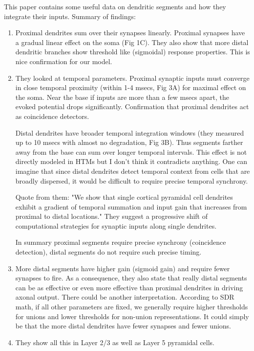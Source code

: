 \documentclass{article} %
\begin{document}
This paper \cite{Branco2011} contains some useful data on dendritic segments
and how they integrate their inputs. Summary of findings:

\begin{enumerate}

\item Proximal dendrites sum over their synapses linearly. Proximal synapses
have a gradual linear effect on the soma (Fig 1C). They also show that more
distal dendritic branches show threshold like (sigmoidal) response properties.
This is nice confirmation for our model.

\item They looked at temporal parameters. Proximal synaptic inputs must converge
in close temporal proximity (within 1-4 msecs, Fig 3A) for maximal effect on the soma.
Near the base if inputs are more than a few msecs apart, the evoked potential
drops significantly. Confirmation that proximal dendrites act as coincidence
detectors.

Distal dendrites have broader temporal integration windows (they measured up to
10 msecs with almost no degradation, Fig 3B). Thus segments farther away from
the base can sum over longer temporal intervals.  This effect is not directly
modeled in HTMs but I don't think it contradicts anything. One can imagine that
since distal dendrites detect temporal context from cells that are broadly
dispersed, it would be difficult to require precise temporal synchrony.

Quote from them: "We show that single cortical pyramidal cell dendrites
exhibit a gradient of temporal summation and input gain that increases from
proximal to distal locations." They suggest a progressive shift of computational
strategies for synaptic inputs along single dendrites.

In summary proximal segments require precise synchrony (coincidence detection),
distal segments do not require such precise timing.

\item More distal segments have higher gain (sigmoid gain) and require fewer
synapses to fire. As a consequence, they also state that really distal segments
can be as effective or even more effective than proximal dendrites in driving
axonal output. There could be another interpretation. According to SDR math, if
all other parameters are fixed, we generally require higher thresholds for
unions and lower thresholds for non-union representations. It could simply be
that the more distal dendrites have fewer synapses and fewer unions.

\item They show all this in Layer 2/3 as well as Layer 5 pyramidal cells.

\end{enumerate}
\end{document}
